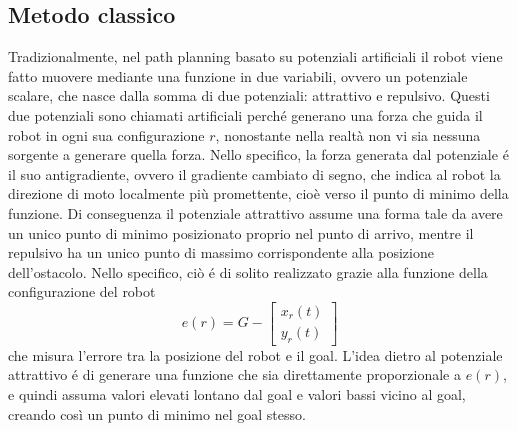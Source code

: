 \documentclass[14pt,a4paper]{extarticle}
\begin{document}
\subsection{Metodo classico}
Tradizionalmente, nel path planning basato su potenziali artificiali il robot viene fatto muovere mediante una funzione in due variabili, ovvero un potenziale scalare, che nasce dalla somma di due potenziali: attrattivo e repulsivo. Questi due potenziali sono chiamati artificiali perché generano una forza che guida il robot in ogni sua configurazione \(r\), nonostante nella realtà non vi sia nessuna sorgente a generare quella forza. Nello specifico, la forza generata dal potenziale é il suo antigradiente, ovvero il gradiente cambiato di segno, che indica al robot la direzione di moto localmente più promettente\cite{oriolo}, cioè verso il punto di minimo della funzione. Di conseguenza il potenziale attrattivo assume una forma tale da avere un unico punto di minimo posizionato proprio nel punto di arrivo, mentre il repulsivo ha un unico punto di massimo corrispondente alla posizione dell'ostacolo. Nello specifico, ciò é di solito realizzato grazie alla funzione della configurazione del robot
\[
e(r) = G - \begin{bmatrix} x_r(t)\\ y_r(t) \end{bmatrix}
\]
che misura l'errore tra la posizione del robot e il goal. L'idea dietro al potenziale attrattivo é di generare una funzione che sia direttamente proporzionale a \(e(r)\), e quindi assuma valori elevati lontano dal goal e valori bassi vicino al goal, creando così un punto di minimo nel goal stesso.
\end{document}
